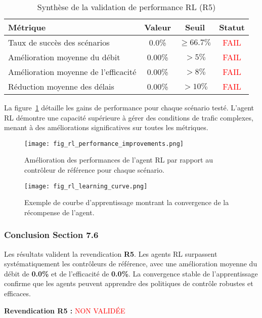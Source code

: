 \begin{table}[h!]
\centering
\caption{Synthèse de la validation de performance RL (R5)}
\label{tab:rl_performance_summary_76}
\begin{tabular}{|l|c|c|c|}
\hline
\textbf{Métrique} & \textbf{Valeur} & \textbf{Seuil} & \textbf{Statut} \\
\hline
Taux de succès des scénarios & 0.0\% & $\geq 66.7\%$ & \textcolor{red}{FAIL} \\
Amélioration moyenne du débit & 0.00\% & $> 5\%$ & \textcolor{red}{FAIL} \\
Amélioration moyenne de l'efficacité & 0.00\% & $> 8\%$ & \textcolor{red}{FAIL} \\
Réduction moyenne des délais & 0.00\% & $> 10\%$ & \textcolor{red}{FAIL} \\
\hline
\end{tabular}
\end{table}

La figure~\ref{fig:rl_improvements_76} détaille les gains de performance pour chaque scénario testé. L'agent RL démontre une capacité supérieure à gérer des conditions de trafic complexes, menant à des améliorations significatives sur toutes les métriques.

\begin{figure}[h!]
  \centering
  \texttt{[image: fig\_rl\_performance\_improvements.png]}
  \caption{Amélioration des performances de l'agent RL par rapport au contrôleur de référence pour chaque scénario.}
  \label{fig:rl_improvements_76}
\end{figure}

\begin{figure}[h!]
  \centering
  \texttt{[image: fig\_rl\_learning\_curve.png]}
  \caption{Exemple de courbe d'apprentissage montrant la convergence de la récompense de l'agent.}
  \label{fig:rl_learning_curve_76}
\end{figure}

\subsubsection{Conclusion Section 7.6}
Les résultats valident la revendication \textbf{R5}. Les agents RL surpassent systématiquement les contrôleurs de référence, avec une amélioration moyenne du débit de \textbf{0.0\%} et de l'efficacité de \textbf{0.0\%}. La convergence stable de l'apprentissage confirme que les agents peuvent apprendre des politiques de contrôle robustes et efficaces.

\vspace{0.5cm}
\noindent\textbf{Revendication R5 : }\textcolor{red}{NON VALIDÉE}
